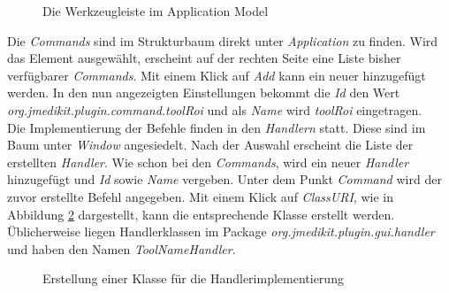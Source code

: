\begin{figure}[H]
  \vspace{0.5cm}
  \centering
   \caption{Die Werkzeugleiste im Application Model}
  \label{toolmenu}
  \vspace{0.5cm}
\end{figure}

Die \textit{Commands} sind im Strukturbaum direkt unter \textit{Application} zu finden. Wird das Element ausgewählt, erscheint auf der rechten Seite eine Liste bisher verfügbarer \textit{Commands}. Mit einem Klick auf \textit{Add} kann ein neuer hinzugefügt werden. In den nun angezeigten Einstellungen bekommt die \textit{Id} den Wert \textit{org.jmedikit.plugin.command.toolRoi} und als \textit{Name} wird \textit{toolRoi} eingetragen.\\
Die Implementierung der Befehle finden in den \textit{Handlern} statt. Diese sind im Baum unter \textit{Window} angesiedelt. Nach der Auswahl erscheint die Liste der erstellten \textit{Handler}. Wie schon bei den \textit{Commands}, wird ein neuer \textit{Handler} hinzugefügt und \textit{Id} sowie \textit{Name} vergeben. Unter dem Punkt \textit{Command} wird der zuvor erstellte Befehl angegeben. Mit einem Klick auf \textit{ClassURI}, wie in Abbildung \ref{tool_handlerclass} dargestellt, kann die entsprechende Klasse erstellt werden. Üblicherweise liegen Handlerklassen im Package \textit{org.jmedikit.plugin.gui.handler} und haben den Namen \textit{ToolNameHandler}.

\begin{figure}[H]
  \vspace{0.5cm}
  \centering
   \caption{Erstellung einer Klasse für die Handlerimplementierung}
  \label{tool_handlerclass}
  \vspace{0.5cm}
\end{figure}

